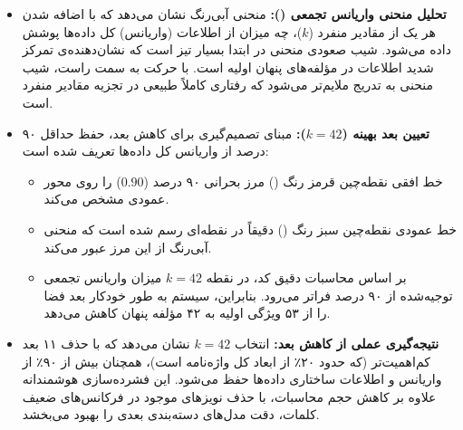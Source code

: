\documentclass{article}
\begin{document}
    \begin{itemize}
        \item \textbf{تحلیل منحنی واریانس تجمعی ():}
        منحنی آبی‌رنگ نشان می‌دهد که با اضافه شدن هر یک از مقادیر منفرد ($k$)، چه میزان از اطلاعات (واریانس) کل داده‌ها پوشش داده می‌شود. شیب صعودی منحنی در ابتدا بسیار تیز است که نشان‌دهنده‌ی تمرکز شدید اطلاعات در مؤلفه‌های پنهان اولیه است. با حرکت به سمت راست، شیب منحنی به تدریج ملایم‌تر می‌شود که رفتاری کاملاً طبیعی در تجزیه مقادیر منفرد است.

        \item \textbf{تعیین بعد بهینه ($k=42$):}
        مبنای تصمیم‌گیری برای کاهش بعد، حفظ حداقل ۹۰ درصد از واریانس کل داده‌ها تعریف شده است:
        \begin{itemize}
            \item خط افقی نقطه‌چین قرمز رنگ () مرز بحرانی ۹۰ درصد ($0.90$) را روی محور عمودی مشخص می‌کند.
            \item خط عمودی نقطه‌چین سبز رنگ () دقیقاً در نقطه‌ای رسم شده است که منحنی آبی‌رنگ از این مرز عبور می‌کند.
            \item بر اساس محاسبات دقیق کد، در نقطه $k = 42$ میزان واریانس تجمعی توجیه‌شده از ۹۰ درصد فراتر می‌رود. بنابراین، سیستم به طور خودکار بعد فضا را از ۵۳ ویژگی اولیه به ۴۲ مؤلفه پنهان کاهش می‌دهد.
        \end{itemize}

        \item \textbf{نتیجه‌گیری عملی از کاهش بعد:}
        انتخاب $k=42$ نشان می‌دهد که با حذف ۱۱ بعد کم‌اهمیت‌تر (که حدود ۲۰٪ از ابعاد کل واژه‌نامه است)، همچنان بیش از ۹۰٪ از واریانس و اطلاعات ساختاری داده‌ها حفظ می‌شود. این فشرده‌سازی هوشمندانه علاوه بر کاهش حجم محاسبات، با حذف نویزهای موجود در فرکانس‌های ضعیف کلمات، دقت مدل‌های دسته‌بندی بعدی را بهبود می‌بخشد.
    \end{itemize}    
\end{document}
